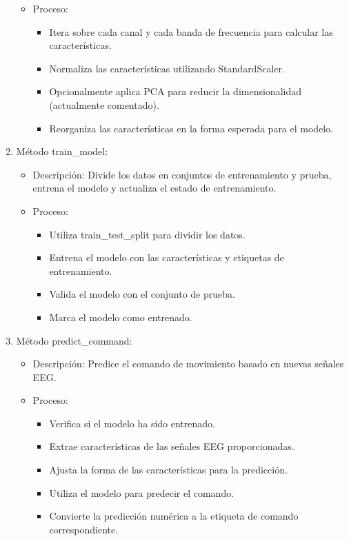 \documentclass{article}
\begin{document}
\begin{enumerate}
\begin{itemize}
\begin{itemize}
        \end{itemize}
        \item Proceso:
        \begin{itemize}
            \item Itera sobre cada canal y cada banda de frecuencia para calcular las características.
            \item Normaliza las características utilizando StandardScaler.
            \item Opcionalmente aplica PCA para reducir la dimensionalidad (actualmente comentado).
            \item Reorganiza las características en la forma esperada para el modelo.
        \end{itemize}
    \end{itemize}
    \item Método train\_model:
    \begin{itemize}
        \item Descripción: Divide los datos en conjuntos de entrenamiento y prueba, entrena el modelo y actualiza el estado de entrenamiento.
        \item Proceso:
        \begin{itemize}
            \item Utiliza train\_test\_split para dividir los datos.
            \item Entrena el modelo con las características y etiquetas de entrenamiento.
            \item Valida el modelo con el conjunto de prueba.
            \item Marca el modelo como entrenado.
        \end{itemize}
    \end{itemize}
    \item Método predict\_command:
    \begin{itemize}
        \item Descripción: Predice el comando de movimiento basado en nuevas señales EEG.
        \newpage
        \item Proceso:
        \begin{itemize}
            \item Verifica si el modelo ha sido entrenado.
            \item Extrae características de las señales EEG proporcionadas.
            \item Ajusta la forma de las características para la predicción.
            \item Utiliza el modelo para predecir el comando.
            \item Convierte la predicción numérica a la etiqueta de comando correspondiente.
        \end{itemize}
    \end{itemize}
\end{enumerate}
\end{document}
